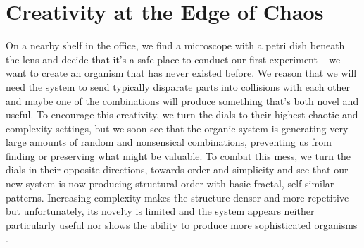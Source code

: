 \documentclass{article}
\begin{document}
\section{Creativity at the Edge of Chaos}


On a nearby shelf in the office, we find a microscope with a petri dish beneath the lens and decide that it's a safe place to conduct our first experiment -- we want to create an organism that has never existed before. We reason that we will need the system to send typically disparate parts into collisions with each other and maybe one of the combinations will produce something that's both novel and useful. To encourage this creativity, we turn the dials to their highest chaotic and complexity settings, but we soon see that the organic system is generating very large amounts of random and nonsensical combinations, preventing us from finding or preserving what might be valuable. To combat this mess, we turn the dials in their opposite directions, towards order and simplicity and see that our new system is now producing structural order with basic fractal, self-similar patterns. Increasing complexity makes the structure denser and more repetitive but unfortunately, its novelty is limited and the system appears neither particularly useful nor shows the ability to produce more sophisticated organisms \cite{eoc}.
\end{document}
